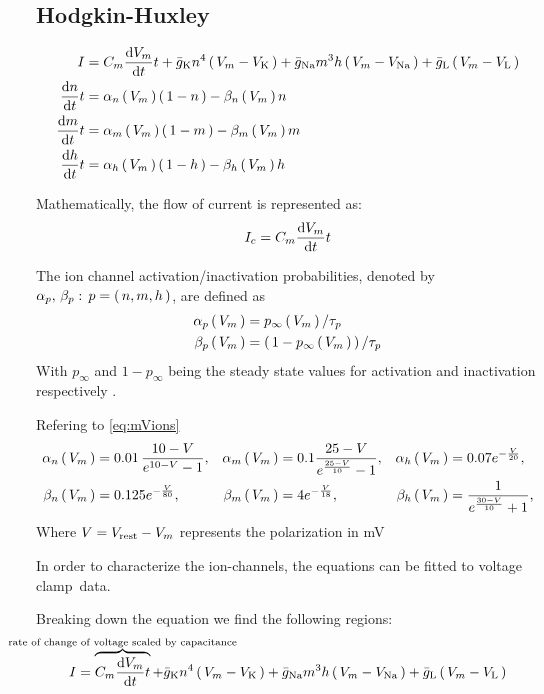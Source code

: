 \documentclass[../../Orator.tex]{subfiles}
\begin{document}
\subsection{Hodgkin-Huxley}
\begin{subequations}\label{eq:HodHuxSys}
    \begin{align}
        I &= C_m \ode{V_m}{t} + \bar{g}_\rmm{K} n^4 \br{V_m - V_\rmm{K}} + \bar{g}_\rmm{Na} m^3 h \br{V_m - V_\rmm{Na}}  + \bar{g}_\rmm{L} \br{V_m - V_\rmm{L}} \\
        \ode{n}{t} &= \alpha_n \br{V_m} \br{1-n} - \beta_n \br{V_m} n \\
        \ode{m}{t} &= \alpha_m \br{V_m} \br{1-m} - \beta_m \br{V_m} m \\
        \ode{h}{t} &= \alpha_h \br{V_m} \br{1-h} - \beta_h \br{V_m} h 
    \end{align}
\end{subequations}

Mathematically, the flow of current is represented as:
\begin{equation}
    I_c = C_m \ode{V_m}{t}
\end{equation}



The ion channel activation/inactivation probabilities, denoted by \(\alpha_p, \, \beta_p : \, p=\br{n,m,h}\), are defined as 
\begin{align}
    \alpha_p\br{V_m} &= p_\infty \br{V_m} / \tau_p \\
    \beta_p\br{V_m}  &= \br{1 - p_\infty \br{V_m}} / \tau_p 
\end{align}
With \(p_\infty\) and \(1-p_\infty\) being the steady state values for activation and inactivation respectively \cite{}. 

Refering to \cref{eq:mVions}
\begin{align*}
    \alpha_n \br{V_m} &= 0.01 \, \frac{ 10 - V }{ e^{ 10 - V } - 1}, &
    \alpha_m \br{V_m} &= 0.1 \frac{ 25 - V }{e^{\frac{25-V}{10}} - 1}, &
    \alpha_h \br{V_m} &=  0.07 e^{-\frac{V}{20}}, \\
    \beta_n \br{V_m}  &= 0.125 e^{- \frac{V}{80}}, &
    \beta_m \br{V_m}  &= 4 e^{- \frac{V}{18}}, &
    \beta_h \br{V_m}  &= \frac{ 1 }{ e^{\frac{30 - V}{10}} + 1},
\end{align*}
Where \(V = V_{\mathrm{rest}} - V_m\) represents the polarization in \unit{\milli\volt}

In order to characterize the ion-channels, the equations can be fitted to voltage clamp\footnotemark~data.


Breaking down the equation we find the following regions:
\begin{equation*}
    I = 
    \overbrace{C_m \ode{V_m}{t}}^{\mathclap{\text{rate of change of voltage scaled by capacitance}}} + 
    \bar{g}_\rmm{K} n^4 \br{V_m - V_\rmm{K}} + 
    \bar{g}_\rmm{Na} m^3 h \br{V_m - V_\rmm{Na}}  + 
    \bar{g}_\rmm{L} \br{V_m - V_\rmm{L}} 
\end{equation*}
\end{document}
